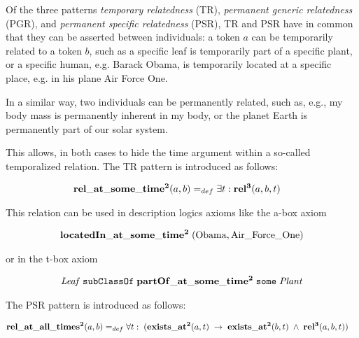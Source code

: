 
 

Of the three patterns \emph{temporary relatedness} (TR), \emph{permanent generic relatedness} (PGR), and \emph{permanent specific relatedness} (PSR), TR and PSR have in common that they can be asserted between individuals: a token $a$ can be temporarily related to a token $b$, such as a specific leaf is temporarily part of a specific plant, or a specific human, e.g. Barack Obama, is temporarily located at a specific place, e.g. in his plane Air Force One.

In a similar way, two individuals can be permanently related, such as, e.g., my body mass is permanently inherent in my body, or the planet Earth is permanently part of our solar system.

This allows, in both cases to hide the time argument within a so-called temporalized relation.
The TR pattern is introduced as follows:  

\begin{equation}
\begin{split}
\mathrm{\mathbf{rel\_at\_some\_time^2}} (a,b) =_{def}&\; \exists t: \mathrm{\mathbf{rel^3}}(a,b,t)  
\end{split}
\label{eq:temporarily:ind}
\end{equation}

This relation can be used in description logics axioms like the a-box axiom

\begin{equation}
\begin{split}
\mathrm{\mathbf{locatedIn\_at\_some\_time^2}} \;(\mathrm{Obama}, \mathrm{Air\_Force\_One})  
\end{split}
\label{eq:personlocated}
\end{equation}

or in the t-box axiom

\begin{equation}
\begin{split}
\mathit{Leaf}\;\mathtt{subClassOf}\;\mathrm{\mathbf{partOf\_at\_some\_time^2}}\;\mathtt{some}\;\mathit{Plant}
\end{split}
\label{eq:Leaf}
\end{equation}    

The PSR pattern is introduced as follows:  

\begin{equation}
\begin{split}
\mathrm{\mathbf{rel\_at\_all\_times^2}} (a,b) =_{def}&\;
\forall t: \; (\mathrm{\mathbf{exists\_at^2}} (a, t) \; \rightarrow \; \mathrm{\mathbf{exists\_at^2}} (b, t) \; \wedge \; \mathrm{\mathbf{rel^3}}(a,b,t))  
\end{split}
\label{eq:permanently:ind}
\end{equation}

